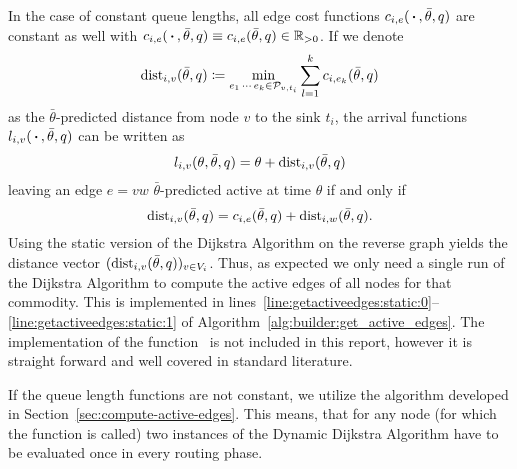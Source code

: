 In the case of constant queue lengths, all edge cost functions $c_{i,e}(\,\boldsymbol{\cdot}\,,\bar\theta,q)$ are constant as well with $c_{i,e}(\,\boldsymbol{\cdot}\,,\bar\theta,q)\equiv c_{i,e}(\bar\theta,q) \in \mathbb{R}_{>0}$.
If we denote \[
  \textrm{dist}_{i,v}(\bar\theta, q)\coloneqq \min_{e_1\,\cdots\,e_k\in\mathcal{P}_{v,t_i}} \sum_{l=1}^k c_{i,e_k}(\bar\theta, q)
\]
as the $\bar\theta$-predicted distance from node $v$ to the sink $t_i$, the arrival functions $l_{i,v}(\,\boldsymbol{\cdot}\,, \bar\theta, q)$ can be written as \[
  l_{i,v}(\theta, \bar\theta, q) = \theta + \textrm{dist}_{i,v}(\bar\theta, q) 
\]
leaving an edge $e=vw$ $\bar\theta$-predicted active at time $\theta$ if and only if \[
  \textrm{dist}_{i,v}(\bar\theta, q) = c_{i,e}(\bar\theta, q) + \textrm{dist}_{i,w}(\bar\theta, q).
\]
Using the static version of the Dijkstra Algorithm on the reverse graph yields the distance vector $(\textrm{dist}_{i,v}(\bar\theta, q))_{v\in V_i}$.
Thus, as expected we only need a single run of the Dijkstra Algorithm to compute the active edges of all nodes for that commodity.
This is implemented in lines~\ref{line:getactiveedges:static:0}--\ref{line:getactiveedges:static:1} of Algorithm~\ref{alg:builder:get_active_edges}.
The implementation of the function~ is not included in this report, however it is straight forward and well covered in standard literature.  

If the queue length functions are not constant, we utilize the algorithm developed in Section~\ref{sec:compute-active-edges}.
This means, that for any node (for which the function  is called) two instances of the Dynamic Dijkstra Algorithm have to be evaluated once in every routing phase. 
